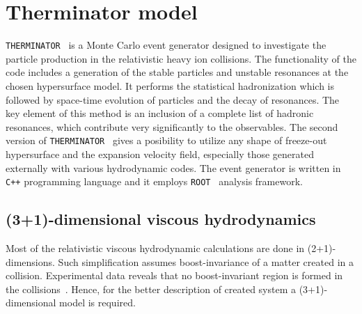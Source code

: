 \chapter{Therminator model}
  \verb|THERMINATOR|~\cite{therminator} is a Monte Carlo event generator designed to investigate the particle production in the relativistic heavy ion collisions.
  The functionality of the code includes a generation of the stable particles and unstable resonances at the chosen hypersurface model.
  It performs the statistical hadronization which is followed by space-time evolution of particles and the decay of resonances.
  The key element of this method is an inclusion of a complete list of hadronic resonances, which contribute very significantly to the observables.
  The second version of \verb|THERMINATOR|~\cite{therminator2} gives a posibility to utilize any shape of freeze-out hypersurface and the expansion velocity field, especially those generated externally with various hydrodynamic codes.
  The event generator is written in \verb|C++| programming language and it employs \verb|ROOT|~\cite{root} analysis framework.
  \section{(3+1)-dimensional viscous hydrodynamics}
  Most of the relativistic viscous hydrodynamic calculations are done in \mbox{(2+1)-dimensions}.
  Such simplification assumes boost-invariance of a matter created in a collision.
  Experimental data reveals that no boost-invariant region is formed in the collisions~\cite{chmeson}.
  Hence, for the better description of created system a \mbox{(3+1)-dimensional} model is required.

